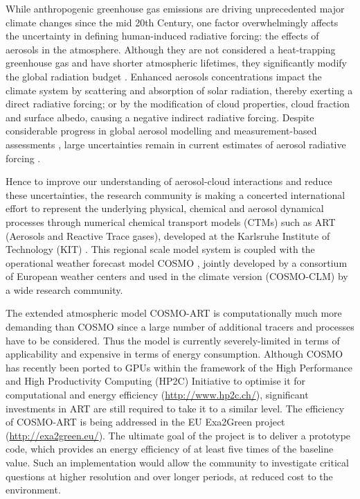 While anthropogenic greenhouse gas emissions are driving unprecedented
major  climate  changes  since   the  mid  20th  Century,  one  factor
overwhelmingly  affects  the  uncertainty  in  defining  human-induced
radiative  forcing:  the  effects   of  aerosols  in  the  atmosphere.
Although they  are not considered  a heat-trapping greenhouse  gas and
have  shorter  atmospheric lifetimes,  they  significantly modify  the
global   radiation   budget   \citep{IPCC-2013}.   Enhanced   aerosols
concentrations impact the climate  system by scattering and absorption
of solar radiation, thereby exerting a direct radiative forcing; or by
the  modification  of cloud  properties,  cloud  fraction and  surface
albedo,  causing  a  negative  indirect  radiative  forcing.   Despite
considerable  progress in  global aerosol  modelling \citep{Mann-2013}
and    measurement-based    assessments   \citep{Myhre-2009},    large
uncertainties  remain  in   current  estimates  of  aerosol  radiative
forcing   \citep{Myhre-2013,    IPCC-2013,   Lee-2013,   Randles-2013,
Rosenfeld-2013, Sherwood-2013, Stier-2013}.

Hence to  improve our understanding of  aerosol-cloud interactions and
reduce  these  uncertainties,  the  research  community  is  making  a
concerted international  effort to represent  the underlying physical,
chemical  and aerosol dynamical  processes through  numerical chemical
transport  models (CTMs)  such  as ART  (Aerosols  and Reactive  Trace
gases),   developed   at  the   Karlsruhe   Institute  of   Technology
(KIT)  \citep{Vogel-2009,  Bangert-2011,  Knote-2013}.  This  regional
scale model  system is coupled  with the operational  weather forecast
model COSMO \citep{Baldauf-2011}, jointly developed by a consortium of
European weather  centers and used in the  climate version (COSMO-CLM)
by a wide research community.

The extended atmospheric model  COSMO-ART is computationally much more
demanding than  COSMO since a  large number of additional  tracers and
processes  have  to  be  considered.   Thus  the  model  is  currently
severely-limited in  terms of applicability and expensive  in terms of
energy  consumption.   Although  COSMO  has recently  been  ported  to
GPUs  \citep{Gysi-2014, Lapillonne-2014} within  the framework  of the
High Performance and High  Productivity Computing (HP2C) Initiative to
optimise    it    for     computational    and    energy    efficiency
(\url{http://www.hp2c.ch/}), significant investments  in ART are still
required to take  it to a similar level.   The efficiency of COSMO-ART
is     being    addressed    in     the    EU     Exa2Green    project
(\url{http://exa2green.eu/}). The  ultimate goal of the  project is to
deliver a  prototype code, which  provides an energy efficiency  of at
least five times of the  baseline value.  Such an implementation would
allow  the  community  to  investigate critical  questions  at  higher
resolution  and   over  longer  periods,   at  reduced  cost   to  the
environment.

